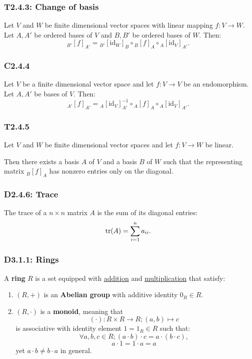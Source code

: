 \documentclass{article}
\begin{document}
\begin{multicols*}{3}
\subsubsection*{T2.4.3: Change of basis}
Let $V$ and $W$ be finite dimensional vector spaces
with linear mapping $f:V\rightarrow W$.
Let $A,A'$ be ordered bases of $V$ and
$B,B'$ be ordered bases of $W$. Then:
$${}_{B'}[f]_{A'}={}_{B'}[\text{id}_W]_{B}
\circ{}_{B}[f]_{A}\circ{}_{A}[\text{id}_V]_{A'}.$$

\subsubsection*{C2.4.4}
Let $V$ be a finite dimensional vector space and let
$f:V\rightarrow V$ be an endomorphism.
Let $A,A'$ be bases of $V$. Then:
$${}_{A'}[f]_{A'}={}_{A}[\text{id}_V]^{-1}_{A'}
\circ{}_{A}[f]_{A}\circ{}_{A}[\text{id}_V]_{A'}.$$

\subsubsection*{T2.4.5}
Let $V$ and $W$ be finite dimensional vector spaces and let
$f:V\rightarrow W$ be linear.

Then there exists a basis $A$ of $V$ and 
a basis $B$ of $W$ such that the representing matrix
${}_B[f]_A$ has nonzero entries only on the diagonal.

\subsubsection*{D2.4.6: Trace}
The trace of a $n\times n$ matrix $A$ is the sum of its diagonal
entries:
$$\tr(A)=\sum_{i=1}^{n}a_{ii}.$$

\subsubsection*{D3.1.1: Rings}
A \textbf{ring} $R$ is a set equipped with \underline{addition}
and \underline{multiplication} that satisfy:
\begin{enumerate}
    \item $(R,+)$ is an \textbf{Abelian group} with additive
    identity $0_R\in R$.
    
    \item $(R,\cdot)$ is a \textbf{monoid}, meaning that
    $$(\cdot):R\times R\rightarrow R;(a,b)\mapsto c$$
    is associative with identity element $1=1_R\in R$ such that:
    $$\forall a,b,c\in R;(a\cdot b)\cdot c
    =a\cdot(b\cdot c),$$
    $$a\cdot1=1\cdot a=a$$
    yet $a\cdot b\neq b\cdot a$ in general.


\end{enumerate}
\end{multicols*}
\end{document}
